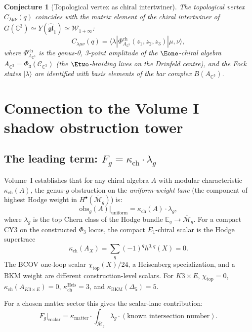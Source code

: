 \documentclass[11pt]{amsart}
\theoremstyle{plain}
\newtheorem{conjecture}[theorem]{Conjecture}
\theoremstyle{definition}
\theoremstyle{remark}
\newcommand{\cC}{\mathcal{C}}
\newcommand{\Mbar}{\overline{\mathcal{M}}}
\begin{document}
\begin{conjecture}[Topological vertex as chiral intertwiner]
\label{conj:vertex-intertwiner}
The topological vertex $C_{\lambda\mu\nu}(q)$ coincides with the matrix
element of the chiral intertwiner of $G(\mathbb{C}^3) \simeq Y(\widehat{\mathfrak{gl}}_1) \simeq \mathcal{W}_{1+\infty}$:
\[
 C_{\lambda\mu\nu}(q) = \langle \lambda |
 \Phi^{\mathrm{ch}}_{A_{\mathbb{C}^3}}(z_1, z_2, z_3) | \mu, \nu \rangle,
\]
where $\Phi^{\mathrm{ch}}_{A_{\mathbb{C}^3}}$ is the genus-0, 3-point amplitude of
the $\Eone$-chiral algebra $A_{\mathbb{C}^3} = \Phi_3(\cC_{\mathbb{C}^3})$
(the $\Etwo$-braiding lives on the Drinfeld centre),
and the Fock states $|\lambda\rangle$ are identified with basis elements
of the bar complex $B(A_{\mathbb{C}^3})$.
\end{conjecture}


\section{Connection to the Volume I shadow obstruction tower}
\label{sec:shadow-tower}

\subsection{The leading term: $F_g = \kappa_{\mathrm{ch}} \cdot \lambda_g$}
\label{sub:leading-term}

Volume~I establishes that for any chiral algebra $A$ with modular
characteristic $\kappa_{\mathrm{ch}}(A)$, the genus-$g$ obstruction on the
\emph{uniform-weight lane} (the component of highest Hodge weight in
$H^\bullet(\Mbar_g)$) is:
\[
 \mathrm{obs}_g(A)\big|_{\mathrm{uniform}} = \kappa_{\mathrm{ch}}(A) \cdot \lambda_g,
\]
where $\lambda_g$ is the top Chern class of the Hodge bundle
$\mathbb{E}_g \to \Mbar_g$. For a compact CY3 on the constructed
$\Phi_3$ locus, the compact $E_1$-chiral scalar is the Hodge supertrace
\[
 \kappa_{\mathrm{ch}}(A_X)=\sum_q(-1)^q h^{0,q}(X)=0.
\]
The BCOV one-loop scalar $\chi_{\mathrm{top}}(X)/24$, a Heisenberg
specialization, and a BKM weight are different construction-level
scalars. For $K3 \times E$, $\chi_{\mathrm{top}}=0$,
$\kappa_{\mathrm{ch}}(A_{K3\times E})=0$,
$\kappa_{\mathrm{ch}}^{\mathrm{Heis}}=3$, and
$\kappa_{\mathrm{BKM}}(\Delta_5)=5$.

For a chosen matter sector this gives the scalar-lane contribution:
\begin{equation}\label{eq:fg-leading}
 F_g\big|_{\mathrm{scalar}} = \kappa_{\mathrm{matter}} \cdot
 \int_{\Mbar_g} \lambda_g \cdot (\text{known intersection number}).
\end{equation}
\end{document}
